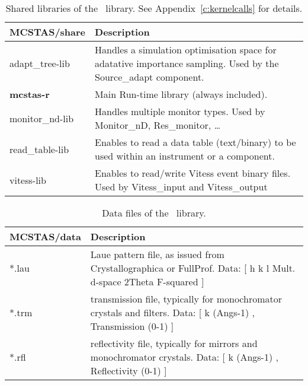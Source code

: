 \begin{table}
  \begin{center}
    {\let\my=\\
    \begin{tabular}{|p{}|p{}|}
      \hline
       {\bf MCSTAS/share} & Description \\
       \hline
       adapt\_tree-lib  & Handles a simulation optimisation space for
       adatative importance sampling.
                          Used by the Source\_adapt component. \\
       {\bf mcstas-r}      &   Main Run-time library (always included). \\
       monitor\_nd-lib & Handles multiple monitor types.
                        Used by Monitor\_nD, Res\_monitor, \ldots \\
       read\_table-lib  & Enables to read a data table (text/binary) to be used within
                          an instrument or a component. \\
       vitess-lib &     Enables to read/write Vitess event binary files.
                        Used by Vitess\_input and Vitess\_output \\
      \hline
    \end{tabular}
    \caption{Shared libraries of the \MCS\ library. See Appendix~\ref{c:kernelcalls} for details.}
    \label{t:comp-share}
    }
  \end{center}
\end{table}

\begin{table}
  \begin{center}
    {\let\my=\\
    \begin{tabular}{|p{}|p{}|}
      \hline
       {\bf MCSTAS/data} & Description \\
       \hline
 *.lau & Laue pattern file, as issued from Crystallographica or FullProf.
       Data: [ h   k   l Mult. d-space 2Theta   F-squared ] \\
 *.trm & transmission file, typically for monochromator crystals and filters.
       Data: [ k (Angs-1) , Transmission (0-1) ] \\
 *.rfl & reflectivity file, typically for mirrors and monochromator crystals.
       Data: [ k (Angs-1) , Reflectivity (0-1) ] \\
      \hline
    \end{tabular}
    \caption{Data files of the \MCS\ library.}
    \label{t:comp-data}
    }
  \end{center}
\end{table}

